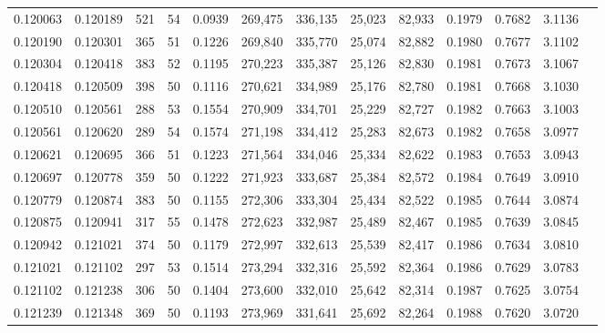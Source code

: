\begin{tabular}{rrrrrrrrrrrrr}
0.120063 & 0.120189 &   521 &  54 &                                     0.0939 & 269,475 & 336,135 &  25,023 &  82,933 & 0.1979 & 0.7682 & 3.1136 \\
0.120190 & 0.120301 &   365 &  51 &                                     0.1226 & 269,840 & 335,770 &  25,074 &  82,882 & 0.1980 & 0.7677 & 3.1102 \\
0.120304 & 0.120418 &   383 &  52 &                                     0.1195 & 270,223 & 335,387 &  25,126 &  82,830 & 0.1981 & 0.7673 & 3.1067 \\
0.120418 & 0.120509 &   398 &  50 &                                     0.1116 & 270,621 & 334,989 &  25,176 &  82,780 & 0.1981 & 0.7668 & 3.1030 \\
0.120510 & 0.120561 &   288 &  53 &                                     0.1554 & 270,909 & 334,701 &  25,229 &  82,727 & 0.1982 & 0.7663 & 3.1003 \\
0.120561 & 0.120620 &   289 &  54 &                                     0.1574 & 271,198 & 334,412 &  25,283 &  82,673 & 0.1982 & 0.7658 & 3.0977 \\
0.120621 & 0.120695 &   366 &  51 &                                     0.1223 & 271,564 & 334,046 &  25,334 &  82,622 & 0.1983 & 0.7653 & 3.0943 \\
0.120697 & 0.120778 &   359 &  50 &                                     0.1222 & 271,923 & 333,687 &  25,384 &  82,572 & 0.1984 & 0.7649 & 3.0910 \\
0.120779 & 0.120874 &   383 &  50 &                                     0.1155 & 272,306 & 333,304 &  25,434 &  82,522 & 0.1985 & 0.7644 & 3.0874 \\
0.120875 & 0.120941 &   317 &  55 &                                     0.1478 & 272,623 & 332,987 &  25,489 &  82,467 & 0.1985 & 0.7639 & 3.0845 \\
0.120942 & 0.121021 &   374 &  50 &                                     0.1179 & 272,997 & 332,613 &  25,539 &  82,417 & 0.1986 & 0.7634 & 3.0810 \\
0.121021 & 0.121102 &   297 &  53 &                                     0.1514 & 273,294 & 332,316 &  25,592 &  82,364 & 0.1986 & 0.7629 & 3.0783 \\
0.121102 & 0.121238 &   306 &  50 &                                     0.1404 & 273,600 & 332,010 &  25,642 &  82,314 & 0.1987 & 0.7625 & 3.0754 \\
0.121239 & 0.121348 &   369 &  50 &                                     0.1193 & 273,969 & 331,641 &  25,692 &  82,264 & 0.1988 & 0.7620 & 3.0720 \\

\end{tabular}
